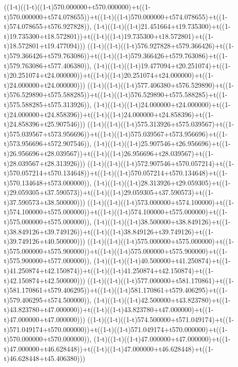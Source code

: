 ((1-t)((1-t)((1-t)570.000000+t570.000000)+t((1-t)570.000000+t574.078655))+t((1-t)((1-t)570.000000+t574.078655)+t((1-t)574.078655+t576.927828)),                                     (1-t)((1-t)((1-t)21.451664+t19.735300)+t((1-t)19.735300+t18.572801))+t((1-t)((1-t)19.735300+t18.572801)+t((1-t)18.572801+t19.477094)))
((1-t)((1-t)((1-t)576.927828+t579.366426)+t((1-t)579.366426+t579.763086))+t((1-t)((1-t)579.366426+t579.763086)+t((1-t)579.763086+t577.406380)),                                     (1-t)((1-t)((1-t)19.477094+t20.251074)+t((1-t)20.251074+t24.000000))+t((1-t)((1-t)20.251074+t24.000000)+t((1-t)24.000000+t24.000000)))
((1-t)((1-t)((1-t)577.406380+t576.529890)+t((1-t)576.529890+t575.588285))+t((1-t)((1-t)576.529890+t575.588285)+t((1-t)575.588285+t575.313926)),                                     (1-t)((1-t)((1-t)24.000000+t24.000000)+t((1-t)24.000000+t24.858396))+t((1-t)((1-t)24.000000+t24.858396)+t((1-t)24.858396+t25.907546)))
((1-t)((1-t)((1-t)575.313926+t575.039567)+t((1-t)575.039567+t573.956696))+t((1-t)((1-t)575.039567+t573.956696)+t((1-t)573.956696+t572.907546)),                                     (1-t)((1-t)((1-t)25.907546+t26.956696)+t((1-t)26.956696+t28.039567))+t((1-t)((1-t)26.956696+t28.039567)+t((1-t)28.039567+t28.313926)))
((1-t)((1-t)((1-t)572.907546+t570.057214)+t((1-t)570.057214+t570.134648))+t((1-t)((1-t)570.057214+t570.134648)+t((1-t)570.134648+t573.000000)),                                     (1-t)((1-t)((1-t)28.313926+t29.059305)+t((1-t)29.059305+t37.590573))+t((1-t)((1-t)29.059305+t37.590573)+t((1-t)37.590573+t38.500000)))
((1-t)((1-t)((1-t)573.000000+t574.100000)+t((1-t)574.100000+t575.000000))+t((1-t)((1-t)574.100000+t575.000000)+t((1-t)575.000000+t575.000000)),                                     (1-t)((1-t)((1-t)38.500000+t38.849126)+t((1-t)38.849126+t39.749126))+t((1-t)((1-t)38.849126+t39.749126)+t((1-t)39.749126+t40.500000)))
((1-t)((1-t)((1-t)575.000000+t575.000000)+t((1-t)575.000000+t575.900000))+t((1-t)((1-t)575.000000+t575.900000)+t((1-t)575.900000+t577.000000)),                                     (1-t)((1-t)((1-t)40.500000+t41.250874)+t((1-t)41.250874+t42.150874))+t((1-t)((1-t)41.250874+t42.150874)+t((1-t)42.150874+t42.500000)))
((1-t)((1-t)((1-t)577.000000+t581.170861)+t((1-t)581.170861+t579.406295))+t((1-t)((1-t)581.170861+t579.406295)+t((1-t)579.406295+t574.500000)),                                     (1-t)((1-t)((1-t)42.500000+t43.823780)+t((1-t)43.823780+t47.000000))+t((1-t)((1-t)43.823780+t47.000000)+t((1-t)47.000000+t47.000000)))
((1-t)((1-t)((1-t)574.500000+t571.049174)+t((1-t)571.049174+t570.000000))+t((1-t)((1-t)571.049174+t570.000000)+t((1-t)570.000000+t570.000000)),                                     (1-t)((1-t)((1-t)47.000000+t47.000000)+t((1-t)47.000000+t46.628448))+t((1-t)((1-t)47.000000+t46.628448)+t((1-t)46.628448+t45.406380)))

